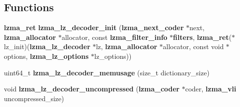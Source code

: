 \subsection*{Functions}
\begin{DoxyCompactItemize}
\item 
{\bf lzma\-\_\-ret} {\bfseries lzma\-\_\-lz\-\_\-decoder\-\_\-init} ({\bf lzma\-\_\-next\-\_\-coder} $\ast$next, {\bf lzma\-\_\-allocator} $\ast$allocator, const {\bf lzma\-\_\-filter\-\_\-info} $\ast${\bf filters}, {\bf lzma\-\_\-ret}($\ast$lz\-\_\-init)({\bf lzma\-\_\-lz\-\_\-decoder} $\ast$lz, {\bf lzma\-\_\-allocator} $\ast$allocator, const void $\ast$options, {\bf lzma\-\_\-lz\-\_\-options} $\ast$lz\-\_\-options))\label{lz__decoder_8h_a3a98cb00f0b1d5e5d8d4e8daa7375d05}

\item 
uint64\-\_\-t {\bfseries lzma\-\_\-lz\-\_\-decoder\-\_\-memusage} (size\-\_\-t dictionary\-\_\-size)\label{lz__decoder_8h_aa715866ca37ce5fd726c391b0da5b882}

\item 
void {\bfseries lzma\-\_\-lz\-\_\-decoder\-\_\-uncompressed} ({\bf lzma\-\_\-coder} $\ast$coder, {\bf lzma\-\_\-vli} uncompressed\-\_\-size)\label{lz__decoder_8h_a1c90ae360afade0460f2015d210ec4e8}


\end{DoxyCompactItemize}
